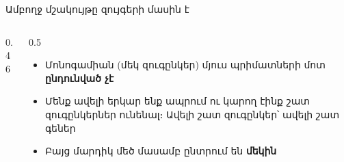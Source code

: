 \begin{frame}{Ամբողջ մշակույթը զույգերի մասին է}
  \begin{columns}[c]
    \begin{column}{0.46\textwidth}
       \par\smallskip
      \par\smallskip
       \par\smallskip
       \par\medskip
    \end{column}
    \begin{column}{0.5\textwidth}
      \begin{itemize}
        \item Մոնոգամիան (մեկ զուգընկեր) մյուս պրիմատների մոտ \textbf{ընդունված չէ}
        \item<2-> Մենք ավելի երկար ենք ապրում ու կարող էինք շատ զուգընկերներ ունենալ։ Ավելի շատ զուգընկեր՝ ավելի շատ գեներ
        \item<2-> Բայց մարդիկ մեծ մասամբ ընտրում են \textbf{մեկին}
      \end{itemize}
    \end{column}
  \end{columns}
\end{frame}

